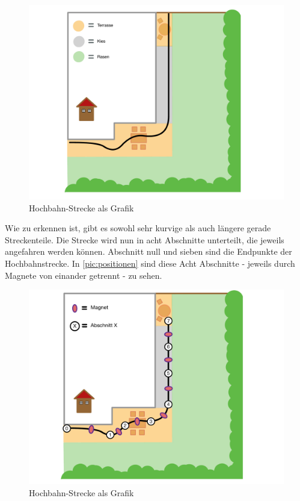\begin{figure}[h]
	\begin{center}
		\includegraphics[width = \textwidth]{Streckengrafik.pdf}
		\caption{\label{pic:streckengrafik} Hochbahn-Strecke als Grafik}
	\end{center}
\end{figure}

Wie zu erkennen ist, gibt es sowohl sehr kurvige als auch längere gerade Streckenteile. Die Strecke wird nun in acht Abschnitte unterteilt, die jeweils angefahren werden können. Abschnitt null und sieben sind die Endpunkte der Hochbahnstrecke.  In \autoref{pic:positionen} sind diese Acht Abschnitte - jeweils durch Magnete von einander getrennt - zu sehen.
\newpage
\begin{figure}[h]
	\begin{center}
		\includegraphics[width = \textwidth]{Positionen.pdf}
		\caption{\label{pic:positionen} Hochbahn-Strecke als Grafik}
	\end{center}
\end{figure}

